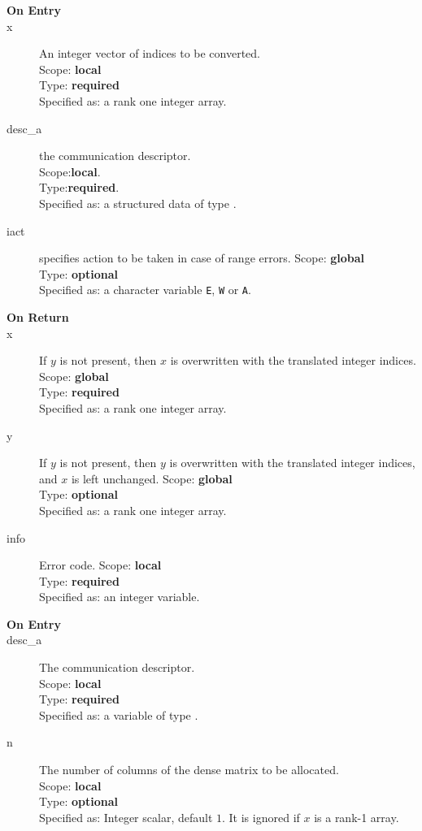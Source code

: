 \begin{description}
\item[\bf On Entry]
\item[x] An integer vector of indices to be converted.\\
Scope: {\bf local} \\
Type: {\bf required}\\
Specified as: a rank one integer array.\\
\item[desc\_a] the communication descriptor.\\
Scope:{\bf local}.\\
Type:{\bf required}.\\
Specified as: a structured data of type \descdata.
\item[iact] specifies action to be taken in case of range errors. 
Scope: {\bf global} \\
Type: {\bf optional}\\
Specified as: a character variable  \verb|E|, \verb|W| or \verb|A|. 
\end{description}

\begin{description}
\item[\bf On Return]
\item[x] If $y$ is not present,
  then $x$ is overwritten with the translated integer indices. 
Scope: {\bf global} \\
Type: {\bf required}\\
Specified as: a rank one integer array.
\item[y] If $y$ is not present,
  then $y$ is overwritten with the translated integer indices, and $x$
  is left unchanged. 
Scope: {\bf global} \\
Type: {\bf optional}\\
Specified as: a rank one integer array.
\item[info] Error code.
Scope: {\bf local} \\
Type: {\bf required}\\
Specified as: an integer variable.
\end{description}




\begin{description}
\item[\bf On Entry]
\item[desc\_a] The communication descriptor.\\
Scope: {\bf local} \\
Type: {\bf required}\\
Specified as: a variable of type \descdata.\\
\item[n] The number of columns of the dense matrix to be allocated.\\
Scope: {\bf local} \\
Type: {\bf optional}\\
Specified as: Integer scalar, default $1$. It is ignored if $x$ is a
rank-1 array. 
\end{description}

